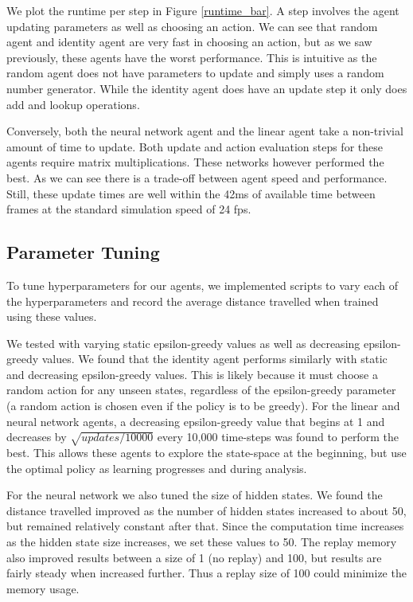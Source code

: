 \documentclass[12pt]{article}
\begin{document}
We plot the runtime per step in Figure \ref{runtime_bar}. A step involves the agent updating parameters as well as choosing an action. We can see that random agent and identity agent are very fast in choosing an action, but as we saw previously, these agents have the worst performance. This is intuitive as the random agent does not have parameters to update and simply uses a random number generator. While the identity agent does have an update step it only does add and lookup operations.

Conversely, both the neural network agent and the linear agent take a non-trivial amount of time to update. Both update and action evaluation steps for these agents require matrix multiplications. These networks however performed the best. As we can see there is a trade-off between agent speed and performance. Still, these update times are well within the 42ms of available time between frames at the standard simulation speed of 24 fps.

\subsection{Parameter Tuning}

To tune hyperparameters for our agents, we implemented scripts to vary each of the hyperparameters and record the average distance travelled when trained using these values. 

We tested with varying static epsilon-greedy values as well as decreasing epsilon-greedy values. We found that the identity agent performs similarly with static and decreasing epsilon-greedy values. This is likely because it must choose a random action for any unseen states, regardless of the epsilon-greedy parameter (a random action is chosen even if the policy is to be greedy). For the linear and neural network agents, a decreasing epsilon-greedy value that begins at 1 and decreases by $\sqrt{updates / 10000}$ every 10,000 time-steps was found to perform the best. This allows these agents to explore the state-space at the beginning, but use the optimal policy as learning progresses and during analysis.

For the neural network we also tuned the size of hidden states. We found the distance travelled improved as the number of hidden states increased to about 50, but remained relatively constant after that. Since the computation time increases as the hidden state size increases, we set these values to 50. The replay memory also improved results between a size of 1 (no replay) and 100, but results are fairly steady when increased further. Thus a replay size of 100 could minimize the memory usage.
\end{document}
